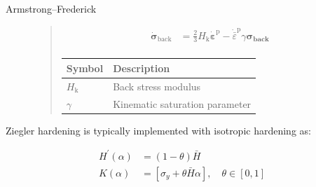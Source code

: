 \begin{description}
\item[Armstrong--Frederick]

\begin{quote}
\[
\begin{aligned}
\dot{\boldsymbol{\sigma}}_\text{back} &=\frac{2}{3} H_\text{k} \dot{\boldsymbol{\varepsilon}}^{\text{p}}-\dot{\bar{\varepsilon}}^{\text{p}} \gamma \boldsymbol{\sigma_\text{back}} \\
\end{aligned}
\]

\begin{longtable}[]{@{}ll@{}}
\toprule\noalign{}
Symbol & Description \\
\midrule\noalign{}
\endhead
\bottomrule\noalign{}
\endlastfoot
\(H_{\text{k}}\) & Back stress modulus \\
\(\gamma\) & Kinematic saturation parameter \\
\end{longtable}
\end{quote}




\end{description}

Ziegler hardening is typically implemented with isotropic hardening as:

\[
\begin{aligned}
H^{\prime}(\alpha) &=(1-\theta) \bar{H} \\
K(\alpha) &=\left[\sigma_{y}+\theta \bar{H} \alpha\right], \quad \theta \in[0,1]
\end{aligned}
\]
